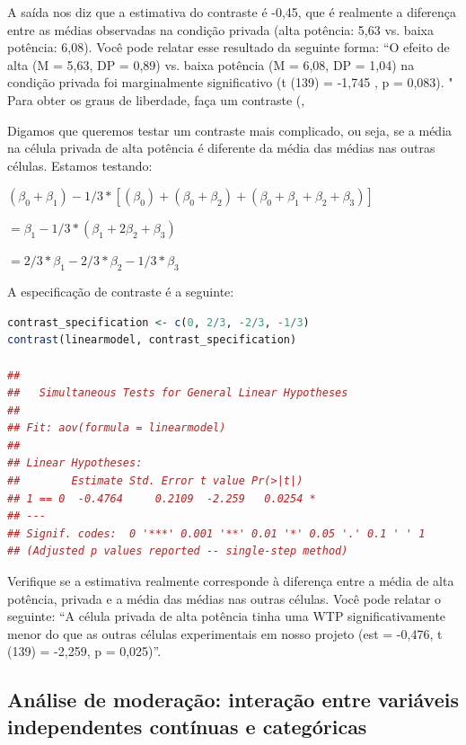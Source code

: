 \documentclass{article}
\begin{document}
A saída nos diz que a estimativa do contraste é -0,45, que é realmente a diferença entre as médias observadas na condição privada (alta potência: 5,63 vs. baixa potência: 6,08). Você pode relatar esse resultado da seguinte forma: “O efeito de alta (M = 5,63, DP = 0,89) vs. baixa potência (M = 6,08, DP = 1,04) na condição privada foi marginalmente significativo (t (139) = -1,745 , p = 0,083). " Para obter os graus de liberdade, faça um contraste (, 

Digamos que queremos testar um contraste mais complicado, ou seja, se a média na célula privada de alta potência é diferente da média das médias nas outras células. Estamos testando:

\begin{center}
$(\beta_0 + \beta_1)-1/3*[(\beta_0)+(\beta_0 +\beta_2)+(\beta_0+\beta_1+\beta_2+\beta_3)]$

\vspace{.25cm}

$=\beta_1-1/3*(\beta_1+2\beta_2+\beta_3)$

\vspace{.25cm}

$=2/3 * \beta_1-2/3 * \beta_2-1/3 * \beta_3$
\end{center}

\newpage
A especificação de contraste é a seguinte:

\begin{lstlisting}[language=R]
contrast_specification <- c(0, 2/3, -2/3, -1/3) 
contrast(linearmodel, contrast_specification)

## 
##   Simultaneous Tests for General Linear Hypotheses
## 
## Fit: aov(formula = linearmodel)
## 
## Linear Hypotheses:
##        Estimate Std. Error t value Pr(>|t|)  
## 1 == 0  -0.4764     0.2109  -2.259   0.0254 *
## ---
## Signif. codes:  0 '***' 0.001 '**' 0.01 '*' 0.05 '.' 0.1 ' ' 1
## (Adjusted p values reported -- single-step method)
\end{lstlisting}

Verifique se a estimativa realmente corresponde à diferença entre a média de alta potência, privada e a média das médias nas outras células. Você pode relatar o seguinte: “A célula privada de alta potência tinha uma WTP significativamente menor do que as outras células experimentais em nosso projeto (est = -0,476, t (139) = -2,259, p = 0,025)”.


\subsection{Análise de moderação: interação entre variáveis independentes contínuas e categóricas}
\end{document}
